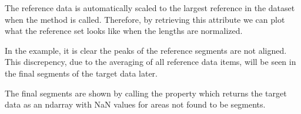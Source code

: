 \documentclass[letterpaper,10pt,english]{sphinxmanual}
\begin{document}
\sphinxAtStartPar
The reference data is automatically scaled to the largest reference in the dataset
when the  method is called. Therefore, by retrieving this attribute
we can plot what the reference set looks like when the lengths are normalized.

\sphinxAtStartPar
In the example, it is clear the peaks of the reference segments are not aligned. 
This discrepency, due to the averaging of all reference data items, will be seen
in the final segments of the target data later.

\begin{sphinxVerbatim}[commandchars=\\\{\}]
  
   \PYG{p}{[} \PYG{p}{[}\PYG{p}{]}         \PYG{p}{]} 
\end{sphinxVerbatim}

\begin{sphinxVerbatim}[commandchars=\\\{\}]
\end{sphinxVerbatim}

\begin{figure}[htbp]
\centering

\noindent{}
\end{figure}

\sphinxAtStartPar
The final segments are shown by calling the property  which returns the 
target data as an ndarray with NaN values for areas not found to be segments.
\end{document}

